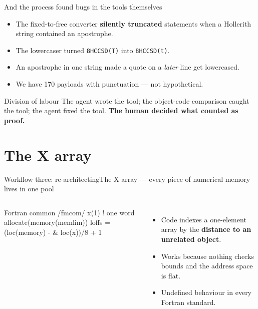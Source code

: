 \documentclass[aspectratio=169]{beamer}
\begin{document}
\begin{frame}{And the process found bugs in the tools themselves}
  \begin{itemize}\setlength\itemsep{5pt}
    \item The fixed-to-free converter \textbf{silently truncated} statements when a Hollerith string contained an apostrophe.
    \item The lowercaser turned \texttt{8HCCSD(T)} into \texttt{8HCCSD(t)}.
    \item An apostrophe in one string made a quote on a \emph{later} line get lowercased.
    \item We have 170 payloads with punctuation --- not hypothetical.
  \end{itemize}
  \vspace{.3em}
  \begin{exampleblock}{Division of labour}
    The agent wrote the tool; the object-code comparison caught the tool; the agent fixed the tool. \textbf{The human decided what counted as proof.}
  \end{exampleblock}
\end{frame}

\section{The X array}

\begin{frame}[fragile]{Workflow three: re-architecting}{The X array --- every piece of numerical memory lives in one pool}
  \begin{columns}[T,onlytextwidth]
      \begin{cookiecode}[title={three lines of Fortran}]{Fortran}
common /fmcom/ x(1)    ! one word
allocate(memory(memlim))
loffs = (loc(memory) - &
         loc(x))/8 + 1
      \end{cookiecode}
      \begin{itemize}\setlength\itemsep{4pt}
        \item Code indexes a one-element array by the \textbf{distance to an unrelated object}.
        \item Works because nothing checks bounds and the address space is flat.
        \item Undefined behaviour in every Fortran standard.
      \end{itemize}
  \end{columns}
\end{frame}
\end{document}

